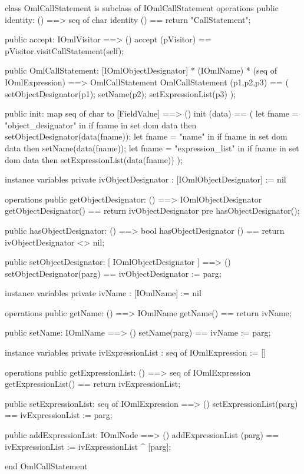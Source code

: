 \begin{vdm_al}
class OmlCallStatement is subclass of IOmlCallStatement
operations
  public identity: () ==> seq of char
  identity () == return "CallStatement";

  public accept: IOmlVisitor ==> ()
  accept (pVisitor) == pVisitor.visitCallStatement(self);

  public OmlCallStatement:
      [IOmlObjectDesignator] *
      (IOmlName) *
      (seq of IOmlExpression) ==> OmlCallStatement
  OmlCallStatement (p1,p2,p3) == 
   ( setObjectDesignator(p1);
     setName(p2);
     setExpressionList(p3) );

  public init: map seq of char to [FieldValue] ==> ()
  init (data) ==
    ( let fname = "object_designator" in
        if fname in set dom data
        then setObjectDesignator(data(fname));
      let fname = "name" in
        if fname in set dom data
        then setName(data(fname));
      let fname = "expression_list" in
        if fname in set dom data
        then setExpressionList(data(fname)) );

instance variables
  private ivObjectDesignator : [IOmlObjectDesignator] := nil

operations
  public getObjectDesignator: () ==> IOmlObjectDesignator
  getObjectDesignator() == return ivObjectDesignator
    pre hasObjectDesignator();

  public hasObjectDesignator: () ==> bool
  hasObjectDesignator () == return ivObjectDesignator <> nil;

  public setObjectDesignator: [ IOmlObjectDesignator ] ==> ()
  setObjectDesignator(parg) == ivObjectDesignator := parg;

instance variables
  private ivName : [IOmlName] := nil

operations
  public getName: () ==> IOmlName
  getName() == return ivName;

  public setName: IOmlName ==> ()
  setName(parg) == ivName := parg;

instance variables
  private ivExpressionList : seq of IOmlExpression := []

operations
  public getExpressionList: () ==> seq of IOmlExpression
  getExpressionList() == return ivExpressionList;

  public setExpressionList: seq of IOmlExpression ==> ()
  setExpressionList(parg) == ivExpressionList := parg;

  public addExpressionList: IOmlNode ==> ()
  addExpressionList (parg) == ivExpressionList := ivExpressionList ^ [parg];

end OmlCallStatement
\end{vdm_al}

